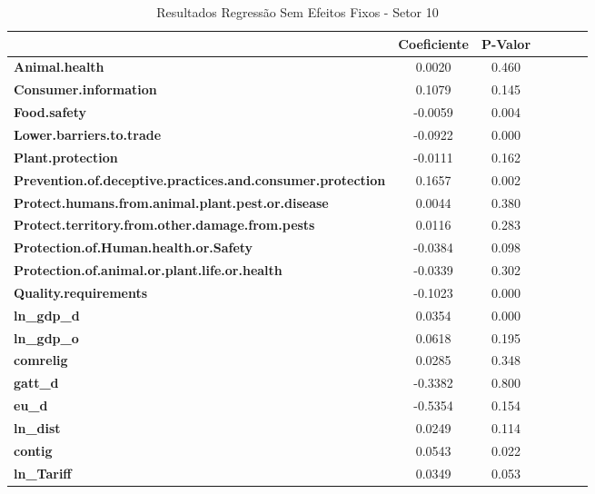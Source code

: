 \begin{table}[ht]
    \begin{center}
        \begin{tabular}{lcccccc}
            & \textbf{Coeficiente} & \textbf{P-Valor} \\
            \midrule
\textbf{Animal.health}                                             &       0.0020 &      0.460  \\
\textbf{Consumer.information}                                      &       0.1079 &      0.145  \\
\textbf{Food.safety}                                               &      -0.0059 &      0.004  \\
\textbf{Lower.barriers.to.trade}                                   &      -0.0922 &      0.000  \\
\textbf{Plant.protection}                                          &      -0.0111 &      0.162  \\
\textbf{Prevention.of.deceptive.practices.and.consumer.protection} &       0.1657 &      0.002  \\
\textbf{Protect.humans.from.animal.plant.pest.or.disease}          &       0.0044 &      0.380  \\
\textbf{Protect.territory.from.other.damage.from.pests}            &       0.0116 &      0.283  \\
\textbf{Protection.of.Human.health.or.Safety}                      &      -0.0384 &      0.098  \\
\textbf{Protection.of.animal.or.plant.life.or.health}              &      -0.0339 &      0.302  \\
\textbf{Quality.requirements}                                      &      -0.1023 &      0.000  \\
\textbf{ln\_gdp\_d}                                                &       0.0354 &      0.000  \\
\textbf{ln\_gdp\_o}                                                &       0.0618 &      0.195  \\
\textbf{comrelig}                                                  &       0.0285 &      0.348  \\
\textbf{gatt\_d}                                                   &      -0.3382 &      0.800  \\
\textbf{eu\_d}                                                     &      -0.5354 &      0.154  \\
\textbf{ln\_dist}                                                  &       0.0249 &      0.114  \\
\textbf{contig}                                                    &       0.0543 &      0.022  \\
\textbf{ln\_Tariff}                                                &       0.0349 &      0.053  \\
\bottomrule
\end{tabular}
\caption{Resultados Regressão Sem Efeitos Fixos - Setor 10}
\end{center}
\end{table}